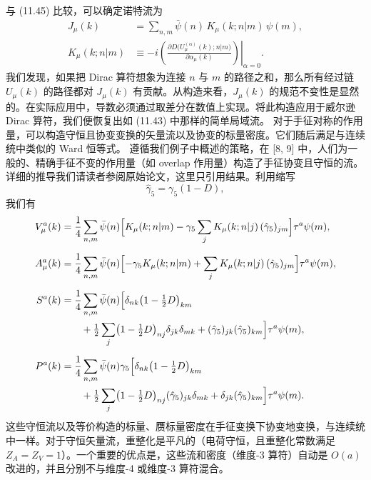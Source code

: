 与 (11.45) 比较，可以确定诺特流为
\begin{equation}
\begin{aligned}
J_\mu(k) &= \sum_{n,m} \bar{\psi}(n)\, K_\mu(k; n|m)\, \psi(m) , \\
K_\mu(k; n|m) &\equiv -i
\left.\left(\frac{\partial D\bigl(U_\mu^{(\alpha)}(k); n|m\bigr)}
{\partial\alpha_\mu(k)}\right)\right|_{\alpha=0} .
\end{aligned}
\end{equation}
我们发现，如果把 Dirac 算符想象为连接 $n$ 与 $m$ 的路径之和，那么所有经过链 $U_\mu(k)$ 的路径都对 $J_\mu(k)$ 有贡献。从构造来看，$J_\mu(k)$ 的规范不变性是显然的。在实际应用中，导数必须通过取差分在数值上实现。将此构造应用于威尔逊 Dirac 算符，我们便恢复出如 (11.43) 中那样的简单局域流。
对于手征对称的作用量，可以构造守恒且协变变换的矢量流以及协变的标量密度。它们随后满足与连续统中类似的 Ward 恒等式。
遵循我们例子中概述的策略，在 [8, 9] 中，人们为一般的、精确手征不变的作用量（如 overlap 作用量）构造了手征协变且守恒的流。详细的推导我们请读者参阅原始论文，这里只引用结果。利用缩写
\begin{equation}
\hat{\gamma}_5 = \gamma_5 (1 - D) ,
\end{equation}
我们有
\begin{equation}
\begin{aligned}
V_\mu^a(k) &=
\frac{1}{4}\sum_{n,m} \bar{\psi}(n)\Bigl[K_\mu(k; n|m)
- \gamma_5\sum_j K_\mu(k; n|j)\,(\hat{\gamma}_5)_{jm}\Bigr]\tau^a\psi(m) , \\[2mm]
A_\mu^a(k) &=
\frac{1}{4}\sum_{n,m} \bar{\psi}(n)\Bigl[-\gamma_5 K_\mu(k; n|m)
+ \sum_j K_\mu(k; n|j)\,(\hat{\gamma}_5)_{jm}\Bigr]\tau^a\psi(m) , \\[2mm]
S^a(k) &=
\frac{1}{4}\sum_{n,m} \bar{\psi}(n)\Bigl[\delta_{nk}\bigl(1 - \tfrac{1}{2} D\bigr)_{km}\\
&\qquad + \tfrac{1}{2}\sum_j \bigl(1 - \tfrac{1}{2} D\bigr)_{nj}\delta_{jk}\delta_{mk}
+ (\hat{\gamma}_5)_{jk}(\hat{\gamma}_5)_{km}\Bigr]\tau^a\psi(m) , \\[2mm]
P^a(k) &=
\frac{1}{4}\sum_{n,m} \bar{\psi}(n)\gamma_5\Bigl[\delta_{nk}\bigl(1 - \tfrac{1}{2} D\bigr)_{km}\\
&\qquad + \tfrac{1}{2}\sum_j \bigl(1 - \tfrac{1}{2} D\bigr)_{nj}(\hat{\gamma}_5)_{jk}\delta_{mk}
+ \delta_{jk}(\hat{\gamma}_5)_{km}\Bigr]\tau^a\psi(m) .
\end{aligned}
\end{equation}
这些守恒流以及等价构造的标量、赝标量密度在手征变换下协变地变换，与连续统中一样。对于守恒矢量流，重整化是平凡的（电荷守恒，且重整化常数满足 $Z_A = Z_V = 1$）。一个重要的优点是，这些流和密度（维度-3 算符）自动是 $O(a)$ 改进的，并且分别不与维度-4 或维度-3 算符混合。
